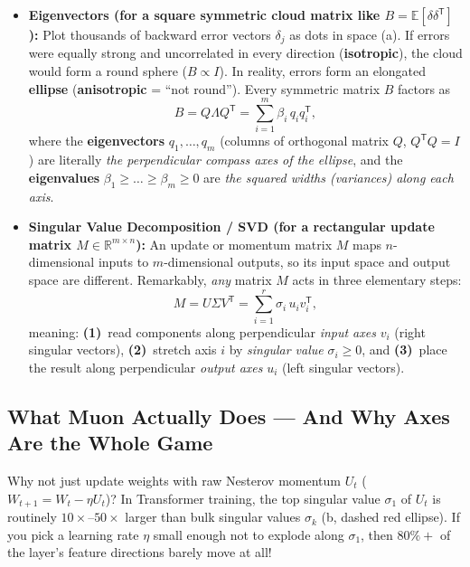 \documentclass[11pt]{article}
\newcommand{\Tr}{{\mathsf{T}}}
\newcommand{\E}{\mathbb{E}}
\newcommand{\R}{\mathbb{R}}
\begin{document}
\begin{itemize}[leftmargin=1.5em, itemsep=3pt, topsep=3pt]
  \item \textbf{Eigenvectors (for a square symmetric cloud matrix like $B = \E[\delta\delta^{\Tr}]$):}
  Plot thousands of backward error vectors $\delta_j$ as dots in space (a). If errors were equally strong and uncorrelated in every direction (\textbf{isotropic}), the cloud would form a round sphere ($B \propto I$).
  In reality, errors form an elongated \textbf{ellipse} (\textbf{anisotropic} = ``not round'').
  Every symmetric matrix $B$ factors as
  \begin{equation}
    B = Q \Lambda Q^{\Tr} = \sum_{i=1}^{m} \beta_i\, q_i q_i^{\Tr},
    \label{eq:eig}
  \end{equation}
  where the \textbf{eigenvectors} $q_1, \dots, q_m$ (columns of orthogonal matrix $Q$, $Q^{\Tr}Q = I$) are literally \emph{the perpendicular compass axes of the ellipse}, and the \textbf{eigenvalues} $\beta_1 \ge \dots \ge \beta_m \ge 0$ are \emph{the squared widths (variances) along each axis}.

  \item \textbf{Singular Value Decomposition / SVD (for a rectangular update matrix $M \in \R^{m \times n}$):}
  An update or momentum matrix $M$ maps $n$-dimensional inputs to $m$-dimensional outputs, so its input space and output space are different.
  Remarkably, \emph{any} matrix $M$ acts in three elementary steps:
  \begin{equation}
    M = U \Sigma V^{\Tr} = \sum_{i=1}^{r} \sigma_i\, u_i v_i^{\Tr},
    \label{eq:svd}
  \end{equation}
  meaning: \textbf{(1)}~read components along perpendicular \emph{input axes} $v_i$ (right singular vectors), \textbf{(2)}~stretch axis $i$ by \emph{singular value} $\sigma_i \ge 0$, and \textbf{(3)}~place the result along perpendicular \emph{output axes} $u_i$ (left singular vectors).
\end{itemize}

\subsection{What Muon Actually Does --- And Why Axes Are the Whole Game}
\label{sec:what_muon_does}

Why not just update weights with raw Nesterov momentum $U_t$ ($W_{t+1} = W_t - \eta U_t$)?
In Transformer training, the top singular value $\sigma_1$ of $U_t$ is routinely $10\times\text{--}50\times$ larger than bulk singular values $\sigma_k$ (b, dashed red ellipse).
If you pick a learning rate $\eta$ small enough not to explode along $\sigma_1$, then $80\%+$ of the layer's feature directions barely move at all!
\end{document}
